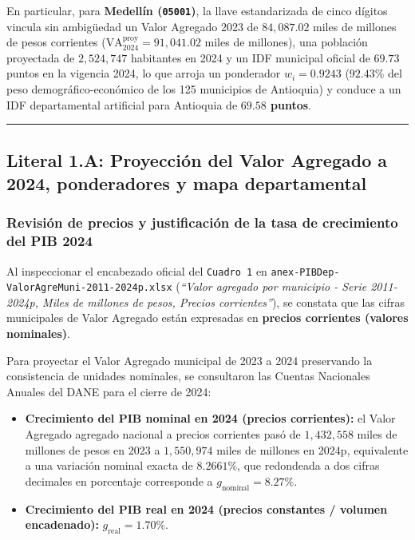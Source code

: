 \documentclass[
  10pt,
  letterpaper,
  DIV=11,
  numbers=noendperiod]{scrartcl}
\providecommand{\tightlist}{%
  \setlength{\itemsep}{0pt}\setlength{\parskip}{0pt}}
\begin{document}
En particular, para \textbf{Medellín (\texttt{05001})}, la llave
estandarizada de cinco dígitos vincula sin ambigüedad un Valor Agregado
2023 de \(84,087.02\) miles de millones de pesos corrientes
(\(\text{VA}_{2024}^{\text{proy}} = 91,041.02\) miles de millones), una
población proyectada de \(2,524,747\) habitantes en 2024 y un IDF
municipal oficial de \(69.73\) puntos en la vigencia 2024, lo que arroja
un ponderador \(w_i = 0.9243\) (\(92.43\%\) del peso
demográfico-económico de los 125 municipios de Antioquia) y conduce a un
IDF departamental artificial para Antioquia de \textbf{\(69.58\)
puntos}.

\begin{center}\rule{0.5\linewidth}{0.5pt}\end{center}

\subsection{Literal 1.A: Proyección del Valor Agregado a 2024,
ponderadores y mapa
departamental}\label{literal-1.a-proyecciuxf3n-del-valor-agregado-a-2024-ponderadores-y-mapa-departamental}

\subsubsection{Revisión de precios y justificación de la tasa de
crecimiento del PIB
2024}\label{revisiuxf3n-de-precios-y-justificaciuxf3n-de-la-tasa-de-crecimiento-del-pib-2024}

Al inspeccionar el encabezado oficial del \texttt{Cuadro\ 1} en
\texttt{anex-PIBDep-ValorAgreMuni-2011-2024p.xlsx} (\emph{``Valor
agregado por municipio - Serie 2011-2024p, Miles de millones de pesos,
Precios corrientes''}), se constata que las cifras municipales de Valor
Agregado están expresadas en \textbf{precios corrientes (valores
nominales)}.

Para proyectar el Valor Agregado municipal de 2023 a 2024 preservando la
consistencia de unidades nominales, se consultaron las Cuentas
Nacionales Anuales del DANE para el cierre de 2024:

\begin{itemize}
\tightlist
\item
  \textbf{Crecimiento del PIB nominal en 2024 (precios corrientes):} el
  Valor Agregado agregado nacional a precios corrientes pasó de
  \(1,432,558\) miles de millones de pesos en 2023 a \(1,550,974\) miles
  de millones en 2024p, equivalente a una variación nominal exacta de
  \(8.2661\%\), que redondeada a dos cifras decimales en porcentaje
  corresponde a \textbf{\(g_{\text{nominal}} = 8.27\%\)}.
\item
  \textbf{Crecimiento del PIB real en 2024 (precios constantes / volumen
  encadenado):} \textbf{\(g_{\text{real}} = 1.70\%\)}.
\end{itemize}
\end{document}
